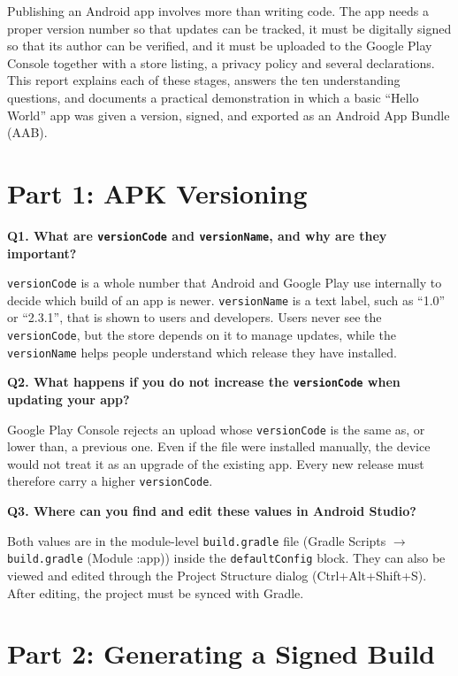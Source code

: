 \documentclass[11pt,letterpaper]{article}
\newcommand{\question}[1]{%
  \Needspace{5\baselineskip}%
  \vspace{6pt}\noindent\textbf{#1}\par\nopagebreak}
\begin{document}
Publishing an Android app involves more than writing code. The app needs a proper
version number so that updates can be tracked, it must be digitally signed so that
its author can be verified, and it must be uploaded to the Google Play Console
together with a store listing, a privacy policy and several declarations. This
report explains each of these stages, answers the ten understanding questions, and
documents a practical demonstration in which a basic ``Hello World'' app was given
a version, signed, and exported as an Android App Bundle (AAB).

\section{Part 1: APK Versioning}

\question{Q1. What are \texttt{versionCode} and \texttt{versionName}, and why are they important?}
\texttt{versionCode} is a whole number that Android and Google Play use internally
to decide which build of an app is newer. \texttt{versionName} is a text label,
such as ``1.0'' or ``2.3.1'', that is shown to users and developers. Users never
see the \texttt{versionCode}, but the store depends on it to manage updates, while
the \texttt{versionName} helps people understand which release they have installed.

\question{Q2. What happens if you do not increase the \texttt{versionCode} when updating your app?}
Google Play Console rejects an upload whose \texttt{versionCode} is the same as, or
lower than, a previous one. Even if the file were installed manually, the device
would not treat it as an upgrade of the existing app. Every new release must
therefore carry a higher \texttt{versionCode}.

\question{Q3. Where can you find and edit these values in Android Studio?}
Both values are in the module-level \texttt{build.gradle} file (Gradle Scripts
$\rightarrow$ \texttt{build.gradle} (Module :app)) inside the \texttt{defaultConfig}
block. They can also be viewed and edited through the Project Structure dialog
(Ctrl+Alt+Shift+S). After editing, the project must be synced with Gradle.

\section{Part 2: Generating a Signed Build}
\end{document}
